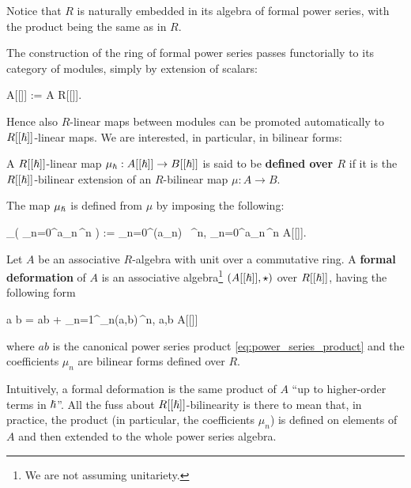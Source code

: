 Notice that $R$ is naturally embedded in its algebra of formal power series, with the product being the same as in $R$.

The construction of the ring of formal power series passes functorially to its category of modules, simply by extension of scalars:
\begin{eqalign}
	A[[\planck]] := A \tens[R] R[[\planck]].
\end{eqalign}
Hence also $R$-linear maps between modules can be promoted automatically to $R[[{\boldsymbol\hslash}]]$-linear maps. We are interested, in particular, in bilinear forms:

\begin{definition}
	A $R[[{\boldsymbol\hslash}]]$-linear map $\mu_\hbar : A[[{\boldsymbol\hslash}]] \to B[[{\boldsymbol\hslash}]]$ is said to be \textbf{defined over $R$} if it is the $R[[{\boldsymbol\hslash}]]$-bilinear extension of an $R$-bilinear map $\mu : A \to B$.
\end{definition}

The map $\mu_{\boldsymbol\hslash}$ is defined from $\mu$ by imposing the following:
\begin{eqalign}
	\mu_\planck\left( \sum_{n=0}^\infty a_n\,\planck^n \right) := \sum_{n=0}^\infty \mu(a_n) \, \planck^n, \quad \forall \sum_{n=0}^\infty a_n\,\planck^n \in A[[\planck]].
\end{eqalign}

\begin{definition}
	Let $A$ be an associative $R$-algebra with unit over a commutative ring. A \textbf{formal deformation} of $A$ is an associative algebra\footnote{We are not assuming unitariety.} $(A[[{\boldsymbol\hslash}]], \star)$ over $R[[{\boldsymbol\hslash}]]$, having the following form
	\begin{eqalign}
		a \star b = ab + \sum_{n=1}^\infty \mu_n(a,b)\,\planck^n, \quad \forall a,b \in A[[\planck]]
	\end{eqalign}
	where $ab$ is the canonical power series product \eqref{eq:power_series_product} and the coefficients $\mu_n$ are bilinear forms defined over $R$.
\end{definition}

\begin{remark}
	Intuitively, a formal deformation is the same product of $A$ ``up to higher-order terms in ${\boldsymbol\hslash}$''. All the fuss about $R[[{\boldsymbol\hslash}]]$-bilinearity is there to mean that, in practice, the product (in particular, the coefficients $\mu_n$) is defined on elements of $A$ and then extended to the whole power series algebra.
\end{remark}

